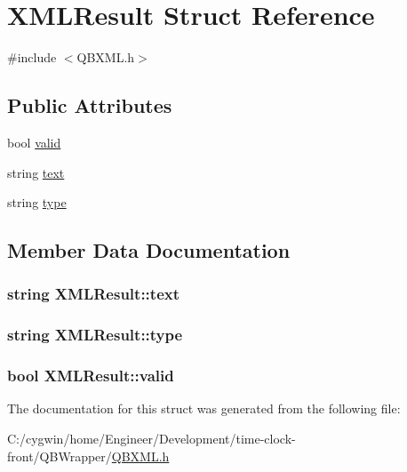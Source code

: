 \hypertarget{struct_x_m_l_result}{}\section{X\+M\+L\+Result Struct Reference}
\label{struct_x_m_l_result}


{\ttfamily \#include $<$Q\+B\+X\+M\+L.\+h$>$}

\subsection*{Public Attributes}
\begin{DoxyCompactItemize}
\item 
bool \hyperlink{struct_x_m_l_result_a2c81c272e36460c8a94740e4ff3b48fb}{valid}
\item 
string \hyperlink{struct_x_m_l_result_a6afef5232dc14e8571d1a3078b04f99f}{text}
\item 
string \hyperlink{struct_x_m_l_result_a6b006e23e884a4b51ce8cb47ff99f0f5}{type}
\end{DoxyCompactItemize}


\subsection{Member Data Documentation}
\hypertarget{struct_x_m_l_result_a6afef5232dc14e8571d1a3078b04f99f}{}
\subsubsection[{text}]{\setlength{\rightskip}{0pt plus 5cm}string X\+M\+L\+Result\+::text}\label{struct_x_m_l_result_a6afef5232dc14e8571d1a3078b04f99f}
\hypertarget{struct_x_m_l_result_a6b006e23e884a4b51ce8cb47ff99f0f5}{}
\subsubsection[{type}]{\setlength{\rightskip}{0pt plus 5cm}string X\+M\+L\+Result\+::type}\label{struct_x_m_l_result_a6b006e23e884a4b51ce8cb47ff99f0f5}
\hypertarget{struct_x_m_l_result_a2c81c272e36460c8a94740e4ff3b48fb}{}
\subsubsection[{valid}]{\setlength{\rightskip}{0pt plus 5cm}bool X\+M\+L\+Result\+::valid}\label{struct_x_m_l_result_a2c81c272e36460c8a94740e4ff3b48fb}


The documentation for this struct was generated from the following file\+:\begin{DoxyCompactItemize}
\item 
C\+:/cygwin/home/\+Engineer/\+Development/time-\/clock-\/front/\+Q\+B\+Wrapper/\hyperlink{_q_b_x_m_l_8h}{Q\+B\+X\+M\+L.\+h}\end{DoxyCompactItemize}
